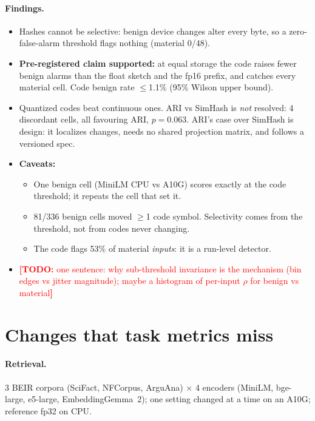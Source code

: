 \documentclass{article}
\newcommand{\todo}[1]{\textcolor{red}{\textbf{[TODO:} #1\textbf{]}}}
\begin{document}
\paragraph{Findings.}
\begin{itemize}
  \item Hashes cannot be selective: benign device changes alter every byte, so a zero-false-alarm threshold flags nothing (material 0/48).
  \item \textbf{Pre-registered claim supported:} at equal storage the code raises fewer benign alarms than the float sketch and the fp16 prefix, and catches every material cell. Code benign rate $\le$1.1\% (95\% Wilson upper bound).
  \item Quantized codes beat continuous ones. ARI vs SimHash is \emph{not} resolved: 4 discordant cells, all favouring ARI, $p=0.063$. ARI's case over SimHash is design: it localizes changes, needs no shared projection matrix, and follows a versioned spec.
  \item \textbf{Caveats:}
  \begin{itemize}
    \item One benign cell (MiniLM CPU vs A10G) scores exactly at the code threshold; it repeats the cell that set it.
    \item 81/336 benign cells moved $\ge$1 code symbol. Selectivity comes from the threshold, not from codes never changing.
    \item The code flags 53\% of material \emph{inputs}: it is a run-level detector.
  \end{itemize}
  \item \todo{one sentence: why sub-threshold invariance is the mechanism (bin edges vs jitter magnitude); maybe a histogram of per-input $\rho$ for benign vs material}
\end{itemize}

\section{Changes that task metrics miss}\label{sec:blind}

\paragraph{Retrieval.} 3 BEIR corpora (SciFact, NFCorpus, ArguAna) $\times$ 4 encoders (MiniLM, bge-large, e5-large, EmbeddingGemma~2); one setting changed at a time on an A10G; reference fp32 on CPU.
\end{document}
